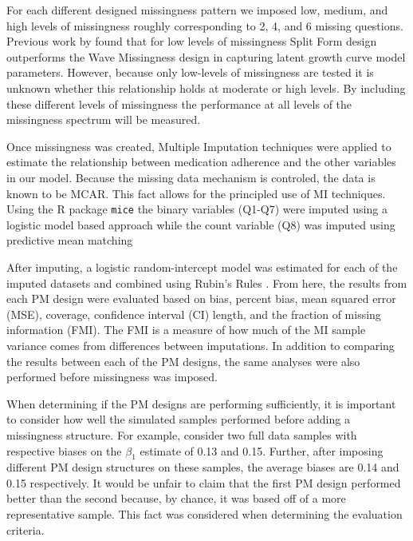 \documentclass{svjour3}\usepackage[]{graphicx}\usepackage[]{color}
\begin{document}
For each different designed missingness pattern we imposed low, medium, and high levels of missingness roughly corresponding to 2, 4, and 6 missing questions. Previous work by \citet{rhemtulla2014planned} found that for low levels of missingness Split Form design outperforms the Wave Missingness design in capturing latent growth curve model parameters. However, because only low-levels of missingness are tested it is unknown whether this relationship holds at moderate or high levels. By including these different levels of missingness the performance at all levels of the missingness spectrum will be measured. \par
Once missingness was created, Multiple Imputation techniques were applied to estimate the relationship between medication adherence and the other variables in our model. Because the missing data mechanism is controled, the data is known to be MCAR. This fact allows for the principled use of MI techniques. Using the R package \texttt{mice} \citep{mice2011imputation} the binary variables (Q1-Q7) were imputed using a logistic model based approach while the count variable (Q8) was imputed using predictive mean matching %
\par

After imputing, a logistic random-intercept model was estimated for each of the imputed datasets and combined using Rubin's Rules \citep{rubin2004multiple}. From here, the results from each PM design were evaluated based on bias, percent bias, mean squared error (MSE), coverage, confidence interval (CI) length, and the fraction of missing information (FMI). The FMI is a measure of how much of the MI sample variance comes from differences between imputations. In addition to comparing the results between each of the PM designs, the same analyses were also performed before missingness was imposed. \par

When determining if the PM designs are performing sufficiently, it is important to consider how well the simulated samples performed before adding a missingness structure. For example, consider two full data samples with respective biases on the $\beta_1$ estimate of 0.13 and 0.15. Further, after imposing different PM design structures on these samples, the average biases are 0.14 and 0.15 respectively. It would be unfair to claim that the first PM design performed better than the second because, by chance, it was based off of a more representative sample. This fact was considered when determining the evaluation criteria. \par
\end{document}

